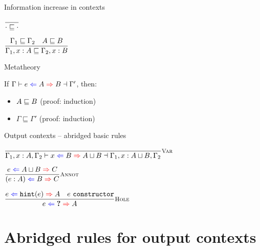 \documentclass{beamer}
\begin{document}
\newcommand{\ctxorder}[2]{#1 \sqsubseteq #2}

\begin{frame}{Information increase in contexts}

\begin{center}
  $\infrule{}{\ctxorder{\emptytypingctx}{\emptytypingctx}}$

  \vspace{2em}

  $\infrule{\ctxorder{\Gamma_1}{\Gamma_2} \quad \hintorder{A}{B}}{\ctxorder{\extend{\Gamma_1}{x}{A}}{\extend{\Gamma_2}{x}{B}}}$
\end{center}

\end{frame}

\begin{frame}{Metatheory}

If $\fulloutctx{\Gamma}{e}{A}{B}{\Gamma'}$, then:

\begin{itemize}
  \item $A \sqsubseteq B$ (proof: induction)
  \item $\ctxorder{\Gamma}{\Gamma'}$ (proof: induction)
\end{itemize}

\end{frame}

\begin{frame}{Output contexts -- abridged basic rules}

\begin{center}
  $\infrule[Var]{}{\fulloutctx{\Gamma_1, x : A, \Gamma_2}{x}{B}{\combinehints{A}{B}}{\Gamma_1, x : \combinehints{A}{B}, \Gamma_2}}$

  \vspace{2em}

  $\infrule[Annot]{\shortoutctx{e}{\combinehints{A}{B}}{C}}{\shortoutctx{\annot{e}{A}}{B}{C}}$

  \vspace{2em}

  $\infrule[Hole]{\shortoutctx{e}{\hintfor{e}}{A} \quad \sidecond{e\ \texttt{constructor}}}{\shortoutctx{e}{\Hole}{A}}$
\end{center}

\end{frame}

\section{Abridged rules for output contexts}
\end{document}
